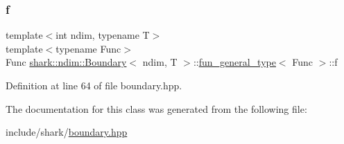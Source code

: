 \subsubsection{\texorpdfstring{f}{f}}
{\footnotesize\ttfamily template$<$int ndim, typename T$>$ \\
template$<$typename Func$>$ \\
Func \hyperlink{classshark_1_1ndim_1_1_boundary}{shark\+::ndim\+::\+Boundary}$<$ ndim, T $>$\+::\hyperlink{classshark_1_1ndim_1_1_boundary_1_1fun__general__type}{fun\+\_\+general\+\_\+type}$<$ Func $>$\+::f\hspace{0.3cm}{\ttfamily [private]}}



Definition at line 64 of file boundary.\+hpp.



The documentation for this class was generated from the following file\+:\begin{DoxyCompactItemize}
\item 
include/shark/\hyperlink{boundary_8hpp}{boundary.\+hpp}\end{DoxyCompactItemize}
